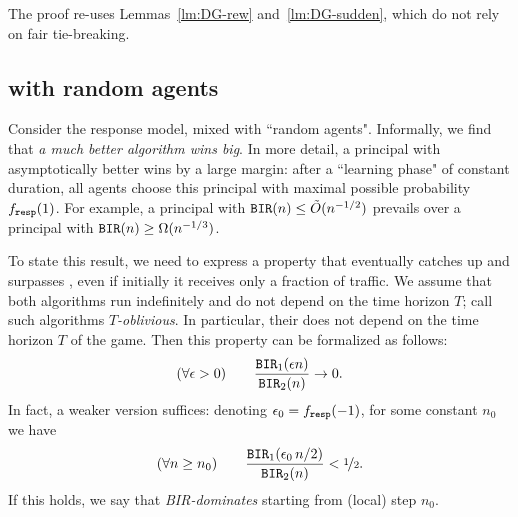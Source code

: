 The proof re-uses Lemmas~\ref{lm:DG-rew} and~\ref{lm:DG-sudden}, which do not rely on fair tie-breaking.



\subsection{\HardMax with random agents}
\label{sec:theory-HMR}

Consider the \HardMaxRandom response model, \ie \HardMax mixed with ``random agents".
Informally, we find that
\emph{a much better algorithm wins big}.
In more detail, a principal with asymptotically better \BIR wins by a large margin: after a ``learning phase" of constant duration, all agents choose this principal with maximal possible probability $f_{\mathtt{resp}}(1)$. For example, a principal with $\mathtt{BIR}(n)\leq \tilde{O}(n^{-1/2})$ prevails over a principal with $\mathtt{BIR}(n)\geq \Omega(n^{-1/3})$.



To state this result, we need to express a property that \alg[1] eventually catches up and surpasses \alg[2], even if initially it receives only a fraction of traffic. We assume that both algorithms run indefinitely and do not depend on the time horizon $T$; call such algorithms \emph{$T$-oblivious}. In particular, their \BIR does not depend on the time horizon $T$ of the game.  Then this property can be formalized as follows:
\begin{align}\label{eq:random-better-clean}
(\forall \epsilon>0)\qquad
\frac{\mathtt{BIR}_1(\epsilon n)}{\mathtt{BIR}_2(n)} \to 0.
\end{align}
In fact, a weaker version suffices:
denoting $\epsilon_0 = f_{\mathtt{resp}}(-1)$, for some constant $n_0$ we have
\begin{align}\label{eq:random-better-weaker}
(\forall n\geq n_0) \qquad
\frac{\mathtt{BIR}_1(\epsilon_0\, n/2)}{\mathtt{BIR}_2(n)} <\nicefrac12.
\end{align}
If this holds, we say that \alg[1] \emph{BIR-dominates} \alg[2] starting from (local) step $n_0$.

